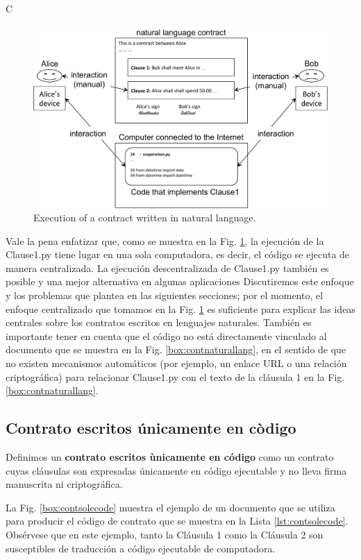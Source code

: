 \documentclass[12pt]{report} %
\begin{document}
C\begin{figure}
\centering
\includegraphics[width=0.85\columnwidth]{figures/execontnaturallang.pdf}
\caption{Execution of a contract written in natural language.}
\label{fig:execontnaturallang}
\end{figure}

Vale la pena enfatizar que, como se muestra en la Fig. \ref{fig:execontnaturallang}, la ejecución de la Clause1.py tiene lugar en una sola computadora, es decir, el código se ejecuta de manera centralizada. La ejecución descentralizada de Clause1.py también es posible y una mejor alternativa en algunas aplicaciones Discutiremos este enfoque y los problemas que plantea en las siguientes secciones; por el momento, el enfoque centralizado que tomamos en la Fig. \ref{fig:execontnaturallang} es suficiente para explicar las ideas centrales sobre los contratos escritos en lenguajes naturales. También es importante tener en cuenta que el código no está directamente vinculado al documento que se muestra en la Fig. \ref{box:contnaturallang}, en el sentido de que no existen mecanismos automáticos (por ejemplo, un enlace URL o una relación criptográfica) para relacionar Clause1.py con el texto de la cláusula 1 en la Fig. \ref{box:contnaturallang}.

\subsection{Contrato escritos únicamente en còdigo}

Definimos un \textbf{contrato escritos ùnicamente en código} como un contrato cuyas cláusulas son expresadas únicamente en código ejecutable y no lleva firma manuscrita ni criptográfica.

La Fig. \ref{box:contsolecode} muestra el ejemplo de un documento que se utiliza para producir el código de contrato que se muestra en la Lista \ref{lst:contsolecode}. Obsérvese que en este ejemplo, tanto la Cláusula 1 como la Cláusula 2 son susceptibles de traducción a código ejecutable de computadora.
\end{document}
